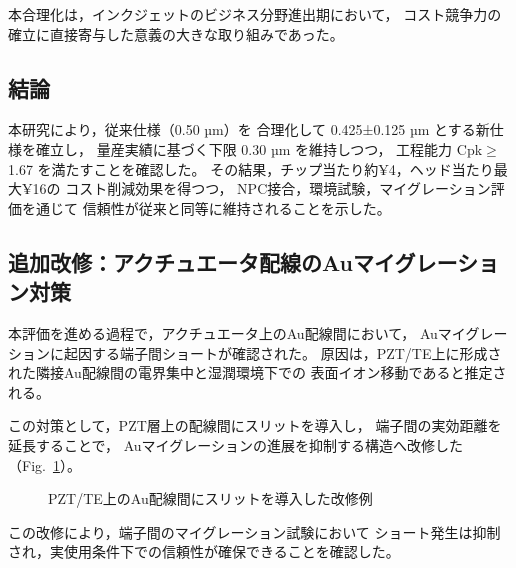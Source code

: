 \documentclass[conference]{IEEEtran}
\begin{document}
本合理化は，インクジェットのビジネス分野進出期において，  
コスト競争力の確立に直接寄与した意義の大きな取り組みであった。

\subsection{結論}
本研究により，従来仕様（0.50 µm）を
合理化して 0.425±0.125 µm とする新仕様を確立し，
量産実績に基づく下限 0.30 µm を維持しつつ，
工程能力 Cpk$\geq$1.67 を満たすことを確認した。  
その結果，チップ当たり約¥4，ヘッド当たり最大¥16の
コスト削減効果を得つつ，
NPC接合，環境試験，マイグレーション評価を通じて
信頼性が従来と同等に維持されることを示した。

\subsection{追加改修：アクチュエータ配線のAuマイグレーション対策}
本評価を進める過程で，アクチュエータ上のAu配線間において，
Auマイグレーションに起因する端子間ショートが確認された。  
原因は，PZT/TE上に形成された隣接Au配線間の電界集中と湿潤環境下での
表面イオン移動であると推定される。

この対策として，PZT層上の配線間にスリットを導入し，
端子間の実効距離を延長することで，
Auマイグレーションの進展を抑制する構造へ改修した
（Fig.~\ref{fig:act-mig}）。  

\begin{figure}[htbp]
  \centering
  \caption{PZT/TE上のAu配線間にスリットを導入した改修例}
  \label{fig:act-mig}
\end{figure}

この改修により，端子間のマイグレーション試験において
ショート発生は抑制され，実使用条件下での信頼性が確保できることを確認した。
\end{document}
